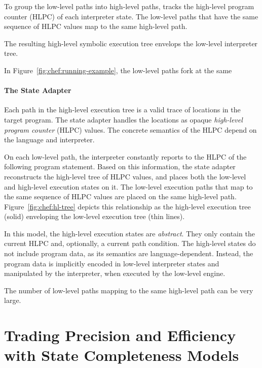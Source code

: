 To group the low-level paths into high-level paths, \chef tracks the high-level program counter (HLPC) of each interpreter state.
%
The low-level paths that have the same sequence of HLPC values map to the same high-level path.

The resulting high-level symbolic execution tree envelops the low-level interpreter tree.
%




In Figure~\ref{fig:chef:running-example}, the low-level paths fork at the same 


\paragraph{The State Adapter}

Each path in the high-level execution tree is a valid trace of locations in the target program.
%
The state adapter handles the locations as opaque \emph{high-level program counter} (HLPC) values.  The concrete semantics of the HLPC depend on the language and interpreter.

On each low-level path, the interpreter constantly reports to \chef the HLPC of the following program statement.
%
Based on this information, the state adapter reconstructs the high-level tree of HLPC values, and places both the low-level and high-level execution states on it.
%
The low-level execution paths that map to the same sequence of HLPC values are placed on the same high-level path.
%
Figure~\ref{fig:chef:hl-tree} depicts this relationship as the high-level execution tree (solid) enveloping the low-level execution tree (thin lines).

In this model, the high-level execution states are \emph{abstract}.
%
They only contain the current HLPC and, optionally, a current path condition.
%
The high-level states do not include program data, as its semantics are language-dependent.  Instead, the program data is implicitly encoded in low-level interpreter states and manipulated by the interpreter, when executed by the low-level engine.

The number of low-level paths mapping to the same high-level path can be very large.


\section{Trading Precision and Efficiency with State Completeness Models}

